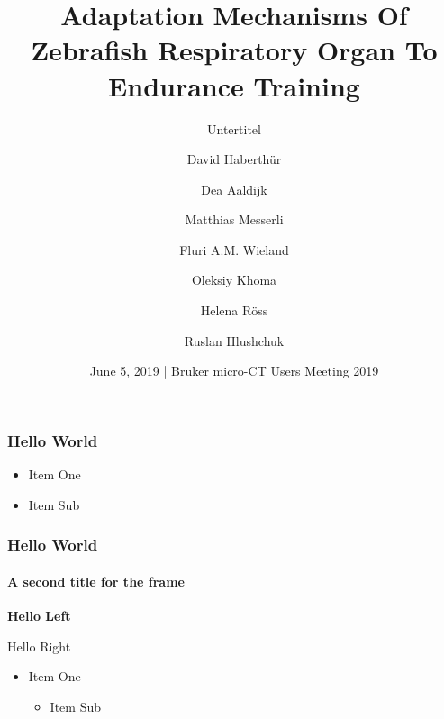 \documentclass[aspectratio=169]{beamer}
\title{Adaptation Mechanisms Of Zebrafish Respiratory Organ To Endurance Training}
\subtitle{Untertitel}
\author[David Haberthür]{David Haberthür \and
	Dea Aaldijk \and
	Matthias Messerli \and
	Fluri A.M. Wieland \and
	Oleksiy Khoma \and
	Helena Röss \and
	Ruslan Hlushchuk}
\institute{Institute of Anatomy\\University of Bern\\Switzerland}
\date{June 5, 2019 | Bruker micro-CT Users Meeting 2019}
\begin{document}
{%
	\begin{frame}%
		\maketitle
	\end{frame}%
}


\begin{frame}
	\frametitle{Hello World}
	
	\begin{itemize}
	\item Item One
	\item Item Sub
	\end{itemize}
\end{frame}

\begin{frame}
	\frametitle{Hello World}
\framesubtitle{A second title for the frame}
\begin{flushleft}
\textbf{Hello Left}
\end{flushleft}
\begin{flushright}
Hello Right
\end{flushright}

\begin{itemize}
\item Item One \cite{Hlushchuk2018}
\begin{itemize}
\item Item Sub
\end{itemize}
\end{itemize}
\end{frame}
\end{document}
